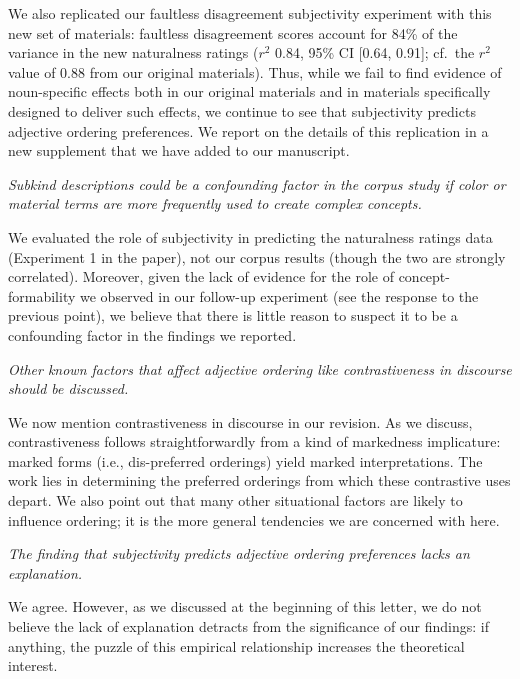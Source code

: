 \documentclass[12pt]{article}
\begin{document}
We also replicated our faultless disagreement subjectivity experiment with this new set of materials: faultless disagreement scores account for 84\% of the variance in the new naturalness ratings ($r^2$ 0.84, 95\% CI [0.64,  0.91]; cf.~the $r^2$ value of 0.88 from our original materials). Thus, while we fail to find evidence of noun-specific effects both in our original materials and in materials specifically designed to deliver such effects, we continue to see that subjectivity predicts adjective ordering preferences. We report on the details of this replication in a new supplement that we have added to our manuscript.


\item  \emph{Subkind descriptions could be a confounding factor in the corpus study if color or material terms are more frequently used to create complex concepts.}

We evaluated the role of subjectivity in predicting the naturalness ratings data (Experiment 1 in the paper), not our corpus results (though the two are strongly correlated). Moreover, given the lack of evidence for the role of concept-formability we observed in our follow-up experiment (see the response to the previous point), we believe that there is little reason to suspect it to be a confounding factor in the findings we reported. 



\item \emph{Other known factors that affect adjective ordering like contrastiveness in discourse should be discussed.}

We now mention contrastiveness in discourse in our revision. As we discuss, contrastiveness follows straightforwardly from a kind of markedness implicature: marked forms (i.e., dis-preferred orderings) yield marked interpretations. The work lies in determining the preferred orderings from which these contrastive uses depart.
We also point out that many other situational factors are likely to influence ordering; it is the more general tendencies we are concerned with here. 


\item \emph{The finding that subjectivity predicts adjective ordering preferences lacks an explanation.}

We agree. However, as we discussed at the beginning of this letter, we do not believe the lack of explanation detracts from the significance of our findings: if anything, the puzzle of this empirical relationship increases the theoretical interest.
\end{document}
